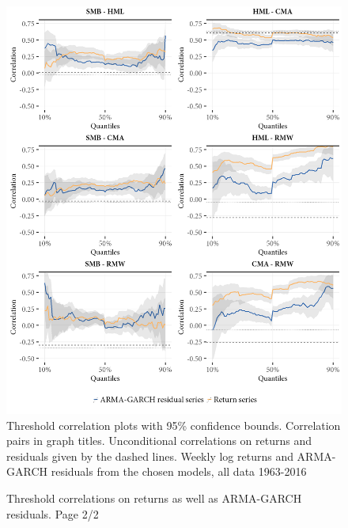 \begin{figure}[H]
  \caption{Threshold correlations on returns as well as ARMA-GARCH residuals. Page 2/2}
  \label{fig:appendix_threshold2}
  \centering
  \begin{minipage}{\textwidth}
  \includegraphics[scale=1]{graphics/appendix_threshold_2.png}  
  \vspace{3mm}
  \footnotesize
  Threshold correlation plots with 95\% confidence bounds. Correlation pairs in graph titles. Unconditional correlations on returns and residuals given by the dashed lines. Weekly log returns and ARMA-GARCH residuals from the chosen models, all data 1963-2016
  \end{minipage}
\end{figure}

\newpage

